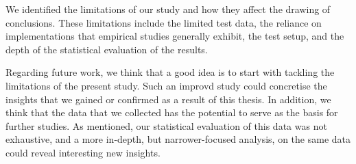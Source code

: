 We identified the limitations of our study and how they affect the drawing of conclusions. These limitations include the limited test data, the reliance on implementations that empirical studies generally exhibit, the test setup, and the depth of the statistical evaluation of the results.

Regarding future work, we think that a good idea is to start with tackling the limitations of the present study. Such an improvd study could concretise the insights that we gained or confirmed as a result of this thesis. In addition, we think that the data that we collected has the potential to serve as the basis for further studies. As mentioned, our statistical evaluation of this data was not exhaustive, and a more in-depth, but narrower-focused analysis, on the same data could reveal interesting new insights.

